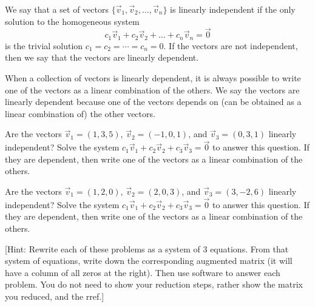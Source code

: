 \begin{definition}
We say that a set of vectors $\{\vec v_1,\vec v_2, \ldots, \vec v_n\}$ is linearly independent if the only solution to the homogeneous system $$c_1\vec v_{1}+c_2\vec v_{2}+\ldots+c_n\vec v_{n}=\vec 0$$ is the trivial solution $c_1=c_2=\cdots=c_n=0$. 
If the vectors are not independent, then we say that the vectors are linearly dependent. 
\end{definition}
When a collection of vectors is linearly dependent, it is always possible to write one of the vectors as a linear combination of the others. We say the vectors are linearly dependent because one of the vectors depends on (can be obtained as a linear combination of) the other vectors.


\begin{problem}
 Are the vectors $\vec v_1 = (1,3,5)$, $ \vec v_2=(-1,0,1)$, and $\vec v_3=(0,3,1)$ linearly independent?  Solve the system $c_1\vec v_1+c_2\vec v_2+c_3\vec v_3=\vec 0$ to answer this question. If they are dependent, then write one of the vectors as a linear combination of the others.

 Are the vectors $\vec v_1 = (1,2,0)$, $ \vec v_2=(2,0,3)$, and $\vec v_3=(3,-2,6)$ linearly independent?  Solve the system $c_1\vec v_1+c_2\vec v_2+c_3\vec v_3=\vec 0$ to answer this question.  If they are dependent, then write one of the vectors as a linear combination of the others. 

[Hint: Rewrite each of these problems as a system of 3 equations. From that system of equations, write down the corresponding augmented matrix (it will have a column of all zeros at the right).  Then use software to answer each problem.  You do  not need to show your reduction steps, rather show the matrix you reduced, and the rref.]
\end{problem}

